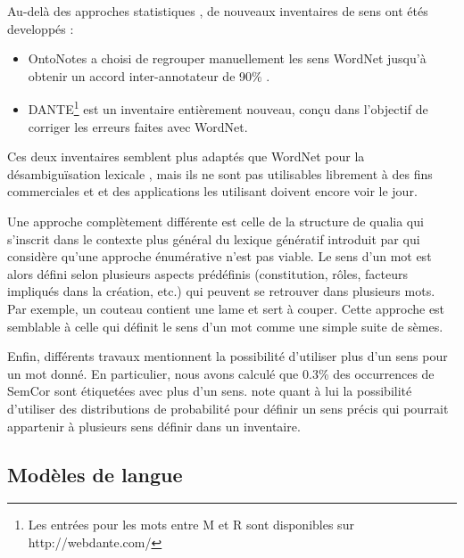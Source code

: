 Au-delà des approches statistiques \citep{snow2007learning}, de nouveaux
inventaires de sens ont étés developpés :

\begin{itemize}

    \item OntoNotes \citep{hovy2006ontonotes} a choisi de regrouper
        manuellement les sens WordNet jusqu'à obtenir un accord
        inter-annotateur de 90\% .

    \item DANTE\footnote{Les entrées pour les mots entre M et R sont
        disponibles sur http://webdante.com/} \citep{mccarthy2010dante} est un
        inventaire entièrement nouveau, conçu dans l'objectif de corriger les
        erreurs faites avec WordNet\citep{kilgarriff2010detailed}.


\end{itemize}

Ces deux inventaires semblent plus adaptés que WordNet pour la désambiguïsation
lexicale \citep{navigli2012quick}, mais ils ne sont pas utilisables librement à
des fins commerciales et et des applications les utilisant doivent encore voir
le jour.

Une approche complètement différente est celle de la structure de qualia
\citep{johnston1996qualia} qui s'inscrit dans le contexte plus général du
lexique génératif introduit par \cite{pustejovsky1991generative} qui considère
qu'une approche énumérative n'est pas viable. Le sens d'un mot est alors défini
selon plusieurs aspects prédéfinis (constitution, rôles, facteurs impliqués
dans la création, etc.) qui peuvent se retrouver dans plusieurs mots. Par
exemple, un couteau contient une lame et sert à couper. Cette approche est
semblable à celle qui définit le sens d'un mot comme une simple suite de sèmes.

Enfin, différents travaux mentionnent la possibilité d'utiliser plus d'un sens
pour un mot donné.
En particulier, nous avons calculé que 0.3\% des occurrences de SemCor sont
étiquetées avec plus d'un sens. \cite{smith2011rumble} note quant à lui la
possibilité d'utiliser des distributions de probabilité pour définir un sens
précis qui pourrait appartenir à plusieurs sens définir dans un inventaire.


\subsection{Modèles de langue}

